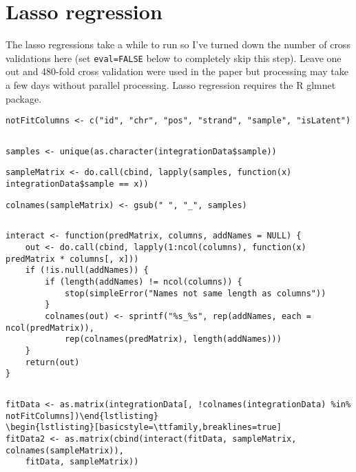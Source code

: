 \documentclass[../../sherrill-Mix_thesis.tex]{subfiles}
\makeatletter
\newenvironment{kframe}{%
 \def\at@end@of@kframe{}%
 \ifinner\ifhmode%
  \def\at@end@of@kframe{\end{minipage}}%
  \begin{minipage}{\columnwidth}%
 \fi\fi%
 \def\FrameCommand##1{\hskip\@totalleftmargin \hskip-\fboxsep
 \colorbox{shadecolor}{##1}\hskip-\fboxsep
     \hskip-\linewidth \hskip-\@totalleftmargin \hskip\columnwidth}%
 \MakeFramed {\advance\hsize-\width
   \@totalleftmargin\z@ \linewidth\hsize
   \@setminipage}}%
 {\par\unskip\endMakeFramed%
 \at@end@of@kframe}
\newenvironment{knitrout}{}{} %
\makeatother
\begin{document}
\section{Lasso regression}
The lasso regressions take a while to run so I've turned down the number of cross validations here (set \texttt{eval=FALSE} below to completely skip this step).  Leave one out and 480-fold cross validation were used in the paper but processing may take a few days without parallel processing. Lasso regression requires the R glmnet package. 
\begin{center}
\begin{knitrout}
\color{fgcolor}\begin{kframe}
\begin{lstlisting}[basicstyle=\ttfamily,breaklines=true]
notFitColumns <- c("id", "chr", "pos", "strand", "sample", "isLatent")\end{lstlisting}
\begin{lstlisting}[basicstyle=\ttfamily,breaklines=true]
\end{lstlisting}
\begin{lstlisting}[basicstyle=\ttfamily,breaklines=true]
samples <- unique(as.character(integrationData$sample))\end{lstlisting}
\begin{lstlisting}[basicstyle=\ttfamily,breaklines=true]
sampleMatrix <- do.call(cbind, lapply(samples, function(x) integrationData$sample == x))\end{lstlisting}
\begin{lstlisting}[basicstyle=\ttfamily,breaklines=true]
colnames(sampleMatrix) <- gsub(" ", "_", samples)\end{lstlisting}
\begin{lstlisting}[basicstyle=\ttfamily,breaklines=true]
\end{lstlisting}
\begin{lstlisting}[basicstyle=\ttfamily,breaklines=true]
interact <- function(predMatrix, columns, addNames = NULL) {
    out <- do.call(cbind, lapply(1:ncol(columns), function(x) predMatrix * columns[, x]))
    if (!is.null(addNames)) {
        if (length(addNames) != ncol(columns)) {
            stop(simpleError("Names not same length as columns"))
        }
        colnames(out) <- sprintf("%s_%s", rep(addNames, each = ncol(predMatrix)), 
            rep(colnames(predMatrix), length(addNames)))
    }
    return(out)
}\end{lstlisting}
\begin{lstlisting}[basicstyle=\ttfamily,breaklines=true]
\end{lstlisting}
\begin{lstlisting}[basicstyle=\ttfamily,breaklines=true]
fitData <- as.matrix(integrationData[, !colnames(integrationData) %in% notFitColumns])\end{lstlisting}
\begin{lstlisting}[basicstyle=\ttfamily,breaklines=true]
fitData2 <- as.matrix(cbind(interact(fitData, sampleMatrix, colnames(sampleMatrix)), 
    fitData, sampleMatrix))\end{lstlisting}
\end{kframe}
\end{knitrout}


\end{center}
\end{document}
